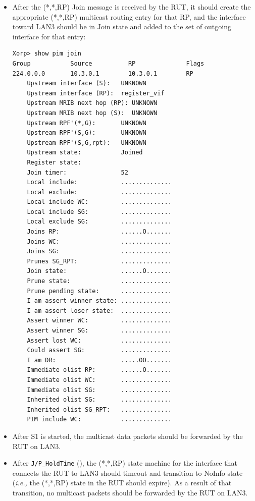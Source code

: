 \documentclass[11pt]{report}
\newcommand{\ie}{\emph{i.e.,}\xspace}
\begin{document}
\begin{itemize}

  \item After the (*,*,RP) Join message is received by the RUT, it
  should create the appropriate (*,*,RP) multicast routing entry for
  that RP, and the interface toward LAN3 should be in Join state and
  added to the set of outgoing interface for that entry:

\begin{verbatim}
Xorp> show pim join 
Group           Source          RP              Flags
224.0.0.0       10.3.0.1        10.3.0.1        RP   
    Upstream interface (S):   UNKNOWN
    Upstream interface (RP):  register_vif
    Upstream MRIB next hop (RP): UNKNOWN
    Upstream MRIB next hop (S):  UNKNOWN
    Upstream RPF'(*,G):       UNKNOWN
    Upstream RPF'(S,G):       UNKNOWN
    Upstream RPF'(S,G,rpt):   UNKNOWN
    Upstream state:           Joined 
    Register state:           
    Join timer:               52
    Local include:            ..............
    Local exclude:            ..............
    Local include WC:         ..............
    Local include SG:         ..............
    Local exclude SG:         ..............
    Joins RP:                 ......O.......
    Joins WC:                 ..............
    Joins SG:                 ..............
    Prunes SG_RPT:            ..............
    Join state:               ......O.......
    Prune state:              ..............
    Prune pending state:      ..............
    I am assert winner state: ..............
    I am assert loser state:  ..............
    Assert winner WC:         ..............
    Assert winner SG:         ..............
    Assert lost WC:           ..............
    Could assert SG:          ..............
    I am DR:                  .....OO.......
    Immediate olist RP:       ......O.......
    Immediate olist WC:       ..............
    Immediate olist SG:       ..............
    Inherited olist SG:       ..............
    Inherited olist SG_RPT:   ..............
    PIM include WC:           ..............
\end{verbatim}

  \item After S1 is started, the multicast data packets should be
  forwarded by the RUT on LAN3.

  \item After \verb=J/P_HoldTime= ({\PimsmJPHoldTime}),
  the (*,*,RP) state machine for the interface that connects the RUT to
  LAN3 should timeout and transition to NoInfo state
  (\ie the (*,*,RP) state in the RUT should expire).
  As a result of that transition, no multicast packets should be
  forwarded by the RUT on LAN3.

\end{itemize}
\end{document}
